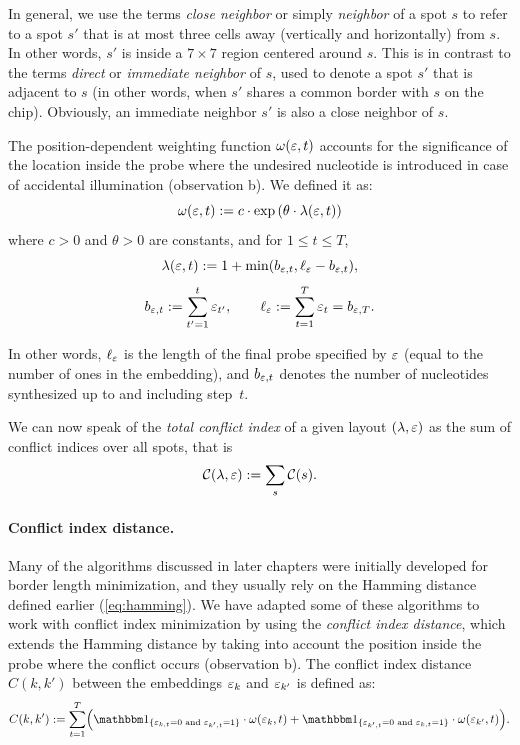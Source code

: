 In general, we use the terms \emph{close neighbor} or simply \emph{neighbor} of
a spot $s$ to refer to a spot $s'$ that is at most three cells away (vertically
and horizontally) from $s$. In other words, $s'$ is inside a $7\times 7$ region
centered around $s$. This is in contrast to the terms \emph{direct} or \emph{
immediate neighbor} of $s$, used to denote a spot $s'$ that is adjacent to $s$
(in other words, when $s'$ shares a common border with $s$ on the chip).
Obviously, an immediate neighbor $s'$ is also a close neighbor of $s$.

The position-dependent weighting function $\omega(\varepsilon,t)$ accounts for the
significance of the location inside the probe where the undesired nucleotide is
introduced in case of accidental illumination (observation b). We defined it as:
\begin{equation}\label{eq:pos_mult}
\omega(\varepsilon,t) := c \cdot \exp{\left(\theta \cdot \lambda(\varepsilon,t)\right)}
\end{equation}
where $c>0$ and $\theta>0$ are constants, and for $1\leq t\leq T$,
\begin{equation}\label{eq:base_pos}
  \lambda(\varepsilon,t) := 1 + \min(b_{\varepsilon,t},\ell_{\varepsilon} - b_{\varepsilon,t}),
\end{equation}
\begin{equation}\label{eq:b_ell}
  b_{\varepsilon,t} := \sum_{t'=1}^{t} \varepsilon_{t'},
  \qquad
  \ell_{\varepsilon} := \sum_{t=1}^{T} \varepsilon_t = b_{\varepsilon,T}.
\end{equation}

In other words, $\ell_\varepsilon$ is the length of the final probe specified by $\varepsilon$
(equal to the number of ones in the embedding), and $b_{\varepsilon,t}$ denotes the
number of nucleotides synthesized up to and including step~$t$.

We can now speak of the \emph{total conflict index} of a given layout
$(\lambda,\varepsilon)$ as the sum of conflict indices over all spots, that is
\begin{equation}
\label{eq:total_conf_idx}
  {\mathcal{C}}(\lambda,\varepsilon) := \sum_{s} {\mathcal{C}}(s).
\end{equation}

\paragraph{Conflict index distance.}
Many of the algorithms discussed in later chapters were initially developed for
border length minimization, and they usually rely on the Hamming distance
defined earlier (\ref{eq:hamming}). We have adapted some of these algorithms to
work with conflict index minimization by using the \emph{conflict index
distance}, which extends the Hamming distance by taking into account the
position inside the probe where the conflict occurs (observation b). The
conflict index distance $C(k,k')$ between the embeddings $\varepsilon_k$ and
$\varepsilon_{k'}$ is defined as:
\begin{equation}
\label{eq:ci_dist}
C(k,k') := \sum_{t=1}^{T}
  \Bigl(
    \Ind{\eps_{k,t}=0 \text{ and } \eps_{k',t}=1}
    \cdot \omega(\eps_{k},t)
    +
    \Ind{\eps_{k',t}=0 \text{ and } \eps_{k,t}=1}
    \cdot \omega(\eps_{k'},t)
  \Bigr).
\end{equation}

